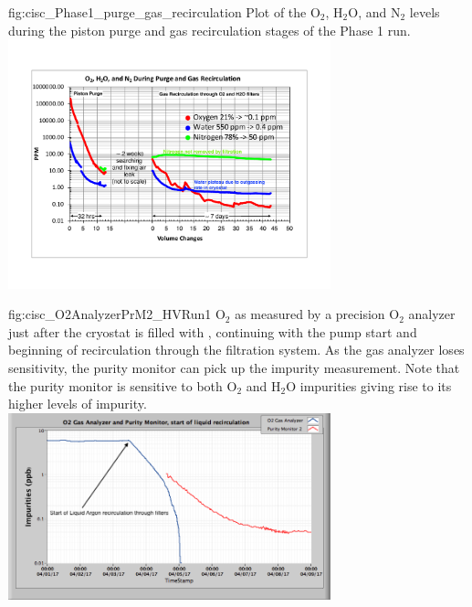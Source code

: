 \begin{dunefigure}{fig:cisc_Phase1_purge_gas_recirculation}
  {Plot of the $\text{O}_2$, $\text{H}_2\text{O}$, and $\text{N}_2$ levels during the piston purge and gas recirculation stages of the  Phase 1 run.}
  \includegraphics[width=0.7\textwidth]{graphics/cisc_Phase1_purge_gas_recirculation}
\end{dunefigure}

\begin{dunefigure}{fig:cisc_O2AnalyzerPrM2_HVRun1}
  {$\text{O}_2$ as measured by a precision $\text{O}_2$ analyzer just after the  cryostat is filled with \lar, continuing with the \lar pump start and beginning of \lar recirculation through the filtration system. As the gas analyzer loses sensitivity, the purity monitor can pick up the impurity measurement. Note that the purity monitor is sensitive to both $\text{O}_2$ and $\text{H}_2\text{O}$ impurities giving rise to its higher levels of impurity.}
  \includegraphics[width=0.7\textwidth]{graphics/cisc_O2AnalyzerPrM2_HVRun1.png}
\end{dunefigure}

